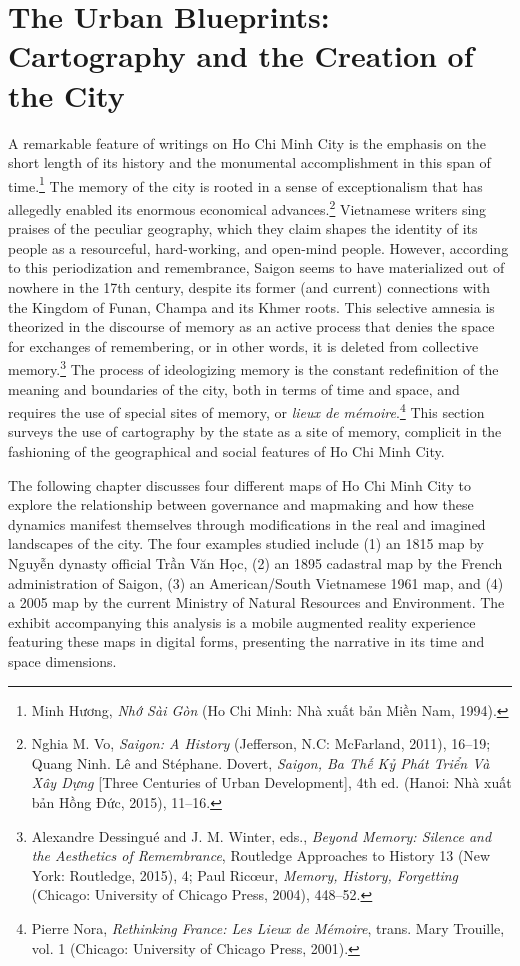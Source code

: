 \chapter[The Urban Blueprints]{The Urban Blueprints: Cartography and the Creation of the City}\label{cartography}

A remarkable feature of writings on Ho Chi Minh City is the emphasis on the short length of its history and the monumental accomplishment in this span of time.\footnote{\vi Minh Hương, \textit{Nhớ Sài Gòn} (Ho Chi Minh: Nhà xuất bản Miền Nam, 1994).} The memory of the city is rooted in a sense of exceptionalism that has allegedly enabled its enormous economical advances.\footnote{\vi Nghia M. Vo, \textit{Saigon: A History} (Jefferson, N.C: McFarland, 2011), 16–19; Quang Ninh. Lê and Stéphane. Dovert, \textit{Saigon, Ba Thế Kỷ Phát Triển Và Xây Dựng} [Three Centuries of Urban Development], 4th ed. (Hanoi: Nhà xuất bản Hồng Đức, 2015), 11–16.} Vietnamese writers sing praises of the peculiar geography, which they claim shapes the identity of its people as a resourceful, hard-working, and open-mind people. However, according to this periodization and remembrance, Saigon seems to have materialized out of nowhere in the 17th century, despite its former (and current) connections with the Kingdom of Funan, Champa and its Khmer roots. This selective amnesia is theorized in the discourse of memory as an active process that denies the space for exchanges of remembering, or in other words, it is deleted from collective memory.\footnote{Alexandre Dessingué and J. M. Winter, eds., \textit{Beyond Memory: Silence and the Aesthetics of Remembrance}, Routledge Approaches to History 13 (New York: Routledge, 2015), 4; Paul Ricœur, \textit{Memory, History, Forgetting} (Chicago: University of Chicago Press, 2004), 448–52.} The process of ideologizing memory is the constant redefinition of the meaning and boundaries of the city, both in terms of time and space, and requires the use of special sites of memory, or \textit{lieux de mémoire}.\footnote{Pierre Nora, \textit{Rethinking France: Les Lieux de Mémoire}, trans. Mary Trouille, vol. 1 (Chicago: University of Chicago Press, 2001).} This section surveys the use of cartography by the state as a site of memory, complicit in the fashioning of the geographical and social features of Ho Chi Minh City.

The following chapter discusses four different maps of Ho Chi Minh City to explore the relationship between governance and mapmaking and how these dynamics manifest themselves through modifications in the real and imagined landscapes of the city. The four examples studied include (1) an 1815 map by \vi Nguyễn dynasty official Trần Văn Học, (2) an 1895 cadastral map by the French administration of Saigon, (3) an American/South Vietnamese 1961 map, and (4) a 2005 map by the current Ministry of Natural Resources and Environment. The exhibit accompanying this analysis is a mobile augmented reality experience featuring these maps in digital forms, presenting the narrative in its time and space dimensions. \en


